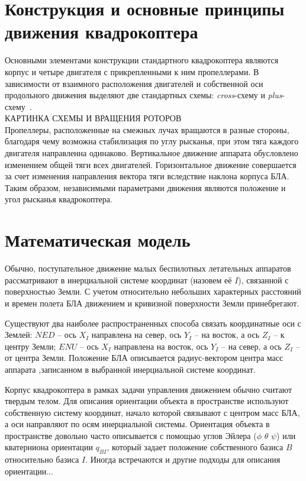 \documentclass[a4paper,14pt,oneside,openany]{memoir}
\begin{document}
	\section{Конструкция и основные принципы движения квадрокоптера}
	
	Основными элементами конструкции стандартного квадрокоптера являются корпус и четыре двигателя с прикрепленными к ним пропеллерами. В зависимости от взаимного расположения двигателей и собственной оси продольного движения выделяют две стандартных схемы: \textit{cross}-схему и \textit{plus}-схему~\cite{Bashi01}.
	\\
	
	КАРТИНКА СХЕМЫ И ВРАЩЕНИЯ РОТОРОВ
	\\
	
	Пропеллеры, расположенные на смежных лучах вращаются в разные стороны, благодаря чему возможна стабилизация по углу рысканья, при этом тяга каждого двигателя направленна одинаково. Вертикальное движение аппарата обусловлено изменением общей тяги всех двигателей. Горизонтальное движение совершается за счет изменения направления вектора тяги вследствие наклона корпуса БЛА. Таким образом, независимыми параметрами движения являются положение и угол рысканья квадрокоптера. 
	
	\section{Математическая модель}
		
	Обычно, поступательное движение малых беспилотных летательных аппаратов рассматривают в инерциальной системе координат (назовем её {$I$}), связанной с поверхностью Земли. С учетом относительно небольших характерных расстояний и времен полета БЛА движением и кривизной поверхности Земли принебрегают.
	
	Существуют два наиболее распространенных способа связать координатные оси с Землей: {$NED$} --  ось \textbf{$X_I$} направлена на север, ось \textbf{$Y_I$} -- на восток, а ось \textbf{$Z_I$} -- к центру Земли; {$ENU$} -- ось \textbf{$X_I$} направлена на восток, ось \textbf{$Y_I$} -- на север, а ось \textbf{$Z_I$} -- от центра Земли. Положение БЛА описывается радиус-вектором центра масс аппарата ,записанном в выбранной инерциальной системе координат.

	Корпус квадрокоптера в рамках задачи управления движением обычно считают твердым телом. Для описания ориентации объекта в пространстве используют собственную систему координат, начало которой связывают с центром масс БЛА, а оси направляют по осям инерциальной системы.
	Ориентация объекта в пространстве довольно часто описывается с помощью углов Эйлера {($\phi$ $\theta$ $\psi$)} или кватерниона ориентации {$q_{BI}$}, который задает положение собственного базиса {$B$} относительно базиса {$I$}. Иногда встречаются и другие подходы для описания ориентации...
	\\
		
\end{document}
